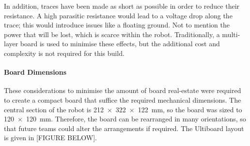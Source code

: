 In addition, traces have been made as short as possible in order to reduce their resistance. A high parasitic resistance would lead to a voltage drop along the trace; this would introduce issues like a floating ground. Not to mention the power that will be lost, which is scarce within the robot. Traditionally, a multi-layer board is used to minimise these effects, but the additional cost and complexity is not required for this build.\par

\paragraph{Board Dimensions}
These considerations to minimise the amount of board real-estate were required to create a compact board that suffice the required mechanical dimensions. The central section of the robot is \SI{212 x 322 x 122}{\milli\meter}, so the board was sized to \SI{120 x 120}{\milli\meter}. Therefore, the board can be rearranged in many orientations, so that future teams could alter the arrangements if required. The Ultiboard layout is given in [FIGURE BELOW].\par

